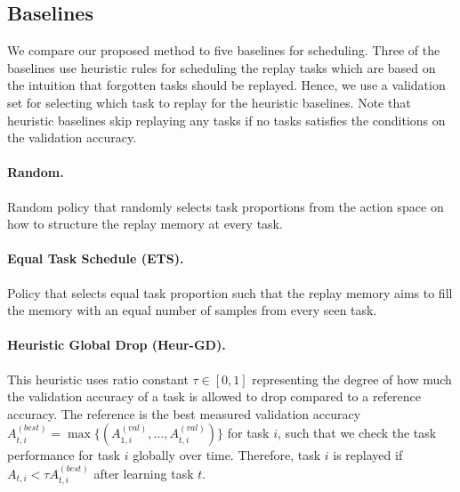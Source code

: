 


\subsection{Baselines}

We compare our proposed method to five baselines for scheduling. Three of the baselines use heuristic rules for scheduling the replay tasks which are based on the intuition that forgotten tasks should be replayed. Hence, we use a validation set for selecting which task to replay for the heuristic baselines. Note that heuristic baselines skip replaying any tasks if no tasks satisfies the conditions on the validation accuracy.

\vspace{-3mm}
\paragraph{Random.} Random policy that randomly selects task proportions from the action space on how to structure the replay memory at every task. 

\vspace{-3mm}
\paragraph{Equal Task Schedule (ETS).} Policy that selects equal task proportion such that the replay memory aims to fill the memory with an equal number of samples from every seen task. 

\vspace{-3mm}
\paragraph{Heuristic Global Drop (Heur-GD).} This heuristic uses ratio constant $\tau \in [0, 1]$ representing the degree of how much the validation accuracy of a task is allowed to drop compared to a reference accuracy. The reference is the best measured validation accuracy $A_{t, i}^{(best)} = \max\{(A_{1, i}^{(val)}, \dots, A_{t, i}^{(val)})\}$ for task $i$, such that we check the task performance for task $i$ globally over time. Therefore, task $i$ is replayed if $A_{t, i} < \tau A_{t, i}^{(best)}$ after learning task $t$. 

